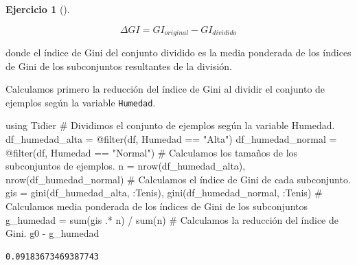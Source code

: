 \documentclass[
  a4paper,
]{scrreport}
\newenvironment{Shaded}{\begin{snugshade}}{\end{snugshade}}
\newcommand{\BuiltInTok}[1]{\textcolor[rgb]{0.00,0.23,0.31}{#1}}
\newcommand{\CommentTok}[1]{\textcolor[rgb]{0.37,0.37,0.37}{#1}}
\newcommand{\FunctionTok}[1]{\textcolor[rgb]{0.28,0.35,0.67}{#1}}
\newcommand{\ImportTok}[1]{\textcolor[rgb]{0.00,0.46,0.62}{#1}}
\newcommand{\NormalTok}[1]{\textcolor[rgb]{0.00,0.23,0.31}{#1}}
\newcommand{\OperatorTok}[1]{\textcolor[rgb]{0.37,0.37,0.37}{#1}}
\newcommand{\PreprocessorTok}[1]{\textcolor[rgb]{0.68,0.00,0.00}{#1}}
\newcommand{\StringTok}[1]{\textcolor[rgb]{0.13,0.47,0.30}{#1}}
\theoremstyle{definition}
\newtheorem{exercise}{Ejercicio}[chapter]
\theoremstyle{remark}
\begin{document}
\begin{exercise}[]
\begin{enumerate}
\begin{tcolorbox}
  \[ \Delta GI = GI_{original} - GI_{dividido} \]

  donde el índice de Gini del conjunto dividido es la media ponderada de
  los índices de Gini de los subconjuntos resultantes de la división.

  \end{tcolorbox}

  \begin{tcolorbox}[enhanced jigsaw, toptitle=1mm, colframe=quarto-callout-tip-color-frame, titlerule=0mm, left=2mm, arc=.35mm, colbacktitle=quarto-callout-tip-color!10!white, opacityback=0, bottomtitle=1mm, toprule=.15mm, coltitle=black, breakable, colback=white, rightrule=.15mm, opacitybacktitle=0.6, leftrule=.75mm, bottomrule=.15mm, title=\textcolor{quarto-callout-tip-color}{\faLightbulb}\hspace{0.5em}{Solución}]

  Calculamos primero la reducción del índice de Gini al dividir el
  conjunto de ejemplos según la variable \texttt{Humedad}.

\begin{Shaded}
\begin{Highlighting}[]
\ImportTok{using} \BuiltInTok{Tidier}
\CommentTok{\# Dividimos el conjunto de ejemplos según la variable Humedad.}
\NormalTok{df\_humedad\_alta }\OperatorTok{=} \PreprocessorTok{@filter}\NormalTok{(df, Humedad }\OperatorTok{==} \StringTok{"Alta"}\NormalTok{)}
\NormalTok{df\_humedad\_normal }\OperatorTok{=} \PreprocessorTok{@filter}\NormalTok{(df, Humedad }\OperatorTok{==} \StringTok{"Normal"}\NormalTok{)}
\CommentTok{\# Calculamos los tamaños de los subconjuntos de ejemplos.}
\NormalTok{n }\OperatorTok{=} \FunctionTok{nrow}\NormalTok{(df\_humedad\_alta), }\FunctionTok{nrow}\NormalTok{(df\_humedad\_normal)}
\CommentTok{\# Calculamos el índice de Gini de cada subconjunto.}
\NormalTok{gis }\OperatorTok{=} \FunctionTok{gini}\NormalTok{(df\_humedad\_alta, }\OperatorTok{:}\NormalTok{Tenis), }\FunctionTok{gini}\NormalTok{(df\_humedad\_normal, }\OperatorTok{:}\NormalTok{Tenis)}
\CommentTok{\# Calculamos media ponderada de los índices de Gini de los subconjuntos }
\NormalTok{g\_humedad }\OperatorTok{=} \FunctionTok{sum}\NormalTok{(gis }\OperatorTok{.*}\NormalTok{ n) }\OperatorTok{/} \FunctionTok{sum}\NormalTok{(n)}
\CommentTok{\# Calculamos la reducción del índice de Gini.}
\NormalTok{g0 }\OperatorTok{{-}}\NormalTok{ g\_humedad}
\end{Highlighting}
\end{Shaded}

\begin{verbatim}
0.09183673469387743
\end{verbatim}


\end{tcolorbox}
\end{enumerate}
\end{exercise}
\end{document}

